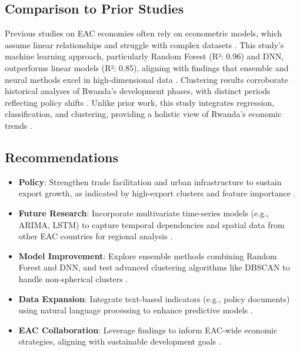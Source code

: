 \documentclass[12pt]{article}
\begin{document}
	\subsection{Comparison to Prior Studies}
	Previous studies on EAC economies often rely on econometric models, which assume linear relationships and struggle with complex datasets \citep{eac}. This study's machine learning approach, particularly Random Forest (R²: 0.96) and DNN, outperforms linear models (R²: 0.85), aligning with findings that ensemble and neural methods excel in high-dimensional data \citep{geron, hastie}. Clustering results corroborate historical analyses of Rwanda's development phases, with distinct periods reflecting policy shifts \citep{wdi, rwanda_vision}. Unlike prior work, this study integrates regression, classification, and clustering, providing a holistic view of Rwanda's economic trends \citep{un_sdg}.
	
	\subsection{Recommendations}
	\begin{itemize}
		\item \textbf{Policy}: Strengthen trade facilitation and urban infrastructure to sustain export growth, as indicated by high-export clusters and feature importance \citep{rwanda_vision, eac}.
		\item \textbf{Future Research}: Incorporate multivariate time-series models (e.g., ARIMA, LSTM) to capture temporal dependencies and spatial data from other EAC countries for regional analysis \citep{time_series}.
		\item \textbf{Model Improvement}: Explore ensemble methods combining Random Forest and DNN, and test advanced clustering algorithms like DBSCAN to handle non-spherical clusters \citep{clustering_metrics}.
		\item \textbf{Data Expansion}: Integrate text-based indicators (e.g., policy documents) using natural language processing to enhance predictive models \citep{nlp_book}.
		\item \textbf{EAC Collaboration}: Leverage findings to inform EAC-wide economic strategies, aligning with sustainable development goals \citep{un_sdg}.
	\end{itemize}
	
\end{document}

